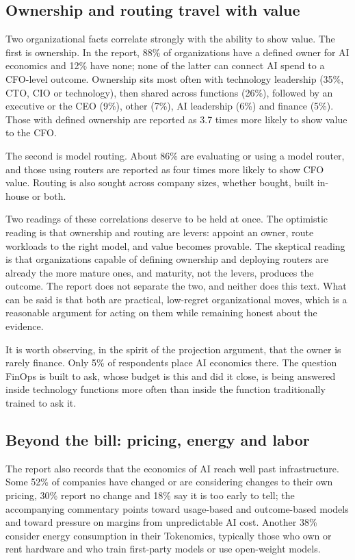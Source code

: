 \documentclass[11pt,a4paper]{article}
\begin{document}
\subsection{Ownership and routing travel with value}

Two organizational facts correlate strongly with the ability to show value. The first is ownership. In the report, 88\% of organizations have a defined owner for AI economics and 12\% have none; none of the latter can connect AI spend to a CFO-level outcome. Ownership sits most often with technology leadership (35\%, CTO, CIO or technology), then shared across functions (26\%), followed by an executive or the CEO (9\%), other (7\%), AI leadership (6\%) and finance (5\%). Those with defined ownership are reported as 3.7 times more likely to show value to the CFO.

The second is model routing. About 86\% are evaluating or using a model router, and those using routers are reported as four times more likely to show CFO value. Routing is also sought across company sizes, whether bought, built in-house or both.

Two readings of these correlations deserve to be held at once. The optimistic reading is that ownership and routing are levers: appoint an owner, route workloads to the right model, and value becomes provable. The skeptical reading is that organizations capable of defining ownership and deploying routers are already the more mature ones, and maturity, not the levers, produces the outcome. The report does not separate the two, and neither does this text. What can be said is that both are practical, low-regret organizational moves, which is a reasonable argument for acting on them while remaining honest about the evidence.

It is worth observing, in the spirit of the projection argument, that the owner is rarely finance. Only 5\% of respondents place AI economics there. The question FinOps is built to ask, whose budget is this and did it close, is being answered inside technology functions more often than inside the function traditionally trained to ask it.

\subsection{Beyond the bill: pricing, energy and labor}

The report also records that the economics of AI reach well past infrastructure. Some 52\% of companies have changed or are considering changes to their own pricing, 30\% report no change and 18\% say it is too early to tell; the accompanying commentary points toward usage-based and outcome-based models and toward pressure on margins from unpredictable AI cost. Another 38\% consider energy consumption in their Tokenomics, typically those who own or rent hardware and who train first-party models or use open-weight models.
\end{document}
